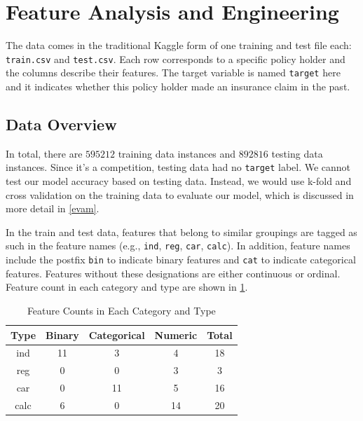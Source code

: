 \documentclass{standalone}
\begin{document}
\section{Feature Analysis and Engineering}\label{preprocessing}

The data comes in the traditional Kaggle form of one training and test file
each: \lstinline{train.csv} and \lstinline{test.csv}. Each row corresponds to a
specific policy holder and the columns describe their features. The target
variable is named \lstinline{target} here and it indicates whether this policy
holder made an insurance claim in the past.

\subsection{Data Overview}

In total, there are $595212$ training data instances and $892816$ testing data
instances. Since it's a competition, testing data had no \lstinline{target}
label. We cannot test our model accuracy based on testing data. Instead, we
would use k-fold and cross validation on the training data to evaluate our
model, which is discussed in more detail in \cref{evam}.

In the train and test data, features that belong to similar groupings are
tagged as such in the feature names (e.g., \lstinline{ind}, \lstinline{reg},
\lstinline{car}, \lstinline{calc}). In addition, feature names include the
postfix \lstinline{bin} to indicate binary features and \lstinline{cat} to
indicate categorical features. Features without these designations are either
continuous or ordinal. Feature count in each category and type are shown in
\cref{feature_count}.

\begin{table}[!h]
\renewcommand{\arraystretch}{1.3}
\caption{Feature Counts in Each Category and Type}\label{feature_count}
\centering
\begin{tabular}{c|cccc}
\hline
\bfseries Type & \bfseries  Binary & \bfseries  Categorical & \bfseries  Numeric & \bfseries Total \\ \hline
\ttfamily ind & 11 & 3 & 4 & 18 \\ \hline
\ttfamily reg & 0 & 0 & 3 & 3 \\ \hline
\ttfamily car & 0 & 11 & 5 & 16 \\ \hline
\ttfamily calc & 6 & 0 & 14 & 20 \\ \hline
\end{tabular}
\end{table}
\end{document}
